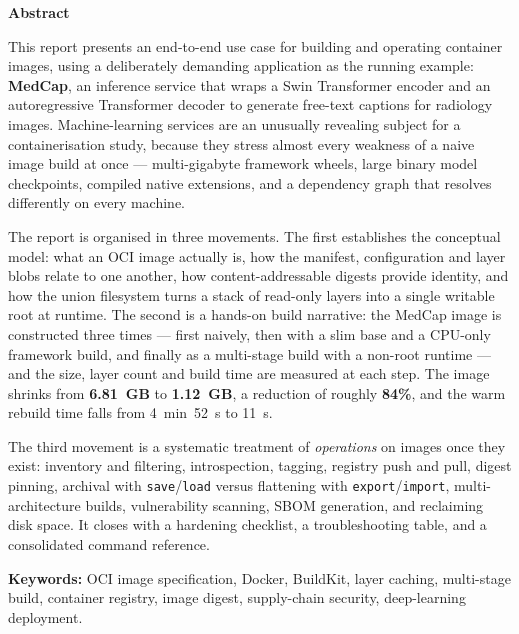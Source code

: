 \documentclass[10pt,a4paper]{article}
\newcommand{\cmd}[1]{\texttt{\small #1}}
\begin{document}
\thispagestyle{plain}
\begin{center}
{\Large\bfseries\color{dkblue} Abstract}
\end{center}
\vspace{4pt}

This report presents an end-to-end use case for building and operating
container images, using a deliberately demanding application as the
running example: \textbf{MedCap}, an inference service that wraps a Swin
Transformer encoder and an autoregressive Transformer decoder to generate
free-text captions for radiology images. Machine-learning services are an
unusually revealing subject for a containerisation study, because they
stress almost every weakness of a naive image build at once --- multi-gigabyte
framework wheels, large binary model checkpoints, compiled native
extensions, and a dependency graph that resolves differently on every
machine.

The report is organised in three movements. The first establishes the
conceptual model: what an OCI image actually is, how the manifest,
configuration and layer blobs relate to one another, how content-addressable
digests provide identity, and how the union filesystem turns a stack of
read-only layers into a single writable root at runtime. The second is a
hands-on build narrative: the MedCap image is constructed three times ---
first naively, then with a slim base and a CPU-only framework build, and
finally as a multi-stage build with a non-root runtime --- and the size,
layer count and build time are measured at each step. The image shrinks from
\textbf{6.81~GB} to \textbf{1.12~GB}, a reduction of roughly \textbf{84\%},
and the warm rebuild time falls from 4~min~52~s to 11~s.

The third movement is a systematic treatment of \emph{operations} on
images once they exist: inventory and filtering, introspection, tagging,
registry push and pull, digest pinning, archival with \cmd{save}/\cmd{load}
versus flattening with \cmd{export}/\cmd{import}, multi-architecture builds,
vulnerability scanning, SBOM generation, and reclaiming disk space. It
closes with a hardening checklist, a troubleshooting table, and a
consolidated command reference.

\vspace{6pt}
\noindent\textbf{Keywords:} OCI image specification, Docker, BuildKit,
layer caching, multi-stage build, container registry, image digest,
supply-chain security, deep-learning deployment.
\end{document}
